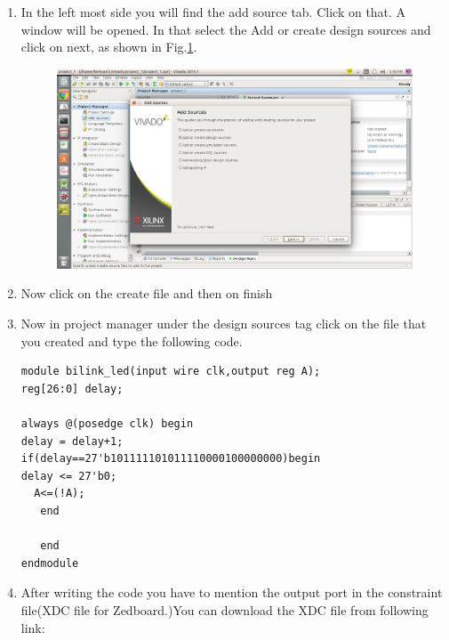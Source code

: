 \documentclass[journal,12pt,twocolumn]{IEEEtran}
\begin{document}
\begin{enumerate}
    \item In the left most side you will find the add source tab. Click on that. A window will be opened. In that select the Add or create design sources and click on  next, as shown in Fig.\ref{fig:Create}.
    \begin{figure}[h]
    \centering
    \includegraphics[scale=.4]{vivado5.eps}
    \caption{}
    \label{fig:Create}
\end{figure}
    
    \item Now click on the create file and then on finish
    
    \item Now in project manager under the design sources tag click on the file that you created and type the following code.
    
\begin{lstlisting}
module bilink_led(input wire clk,output reg A);
reg[26:0] delay;

always @(posedge clk) begin
delay = delay+1; 
if(delay==27'b101111101011110000100000000)begin 
delay <= 27'b0;
  A<=(!A);
   end

   end   
endmodule
\end{lstlisting}


\item After writing the code you have to mention the output port in the constraint file(XDC file for Zedboard.)You can download the XDC file from following link:


\end{enumerate}
\end{document}
